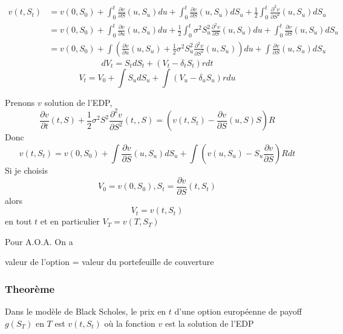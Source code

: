 \documentclass{article}
\theoremstyle{plain}
\theoremstyle{definition}
\begin{document}
\begin{equation}
\begin{split}
v(t, S_t)&=v(0,S_0)+\int_0^t\frac{\partial v}{\partial S}(u,S_u)du+\int_0^t\frac{\partial v}{\partial S}(u, S_u)
 dS_u + \frac{1}{2}\int_0^t\frac{\partial^2 v}{\partial S^2}(u,S_u)dS_u\\
 &=v(0,S_0)+\int_0^t\frac{\partial v}{\partial u}(u,S_u)du+\frac{1}{2}\int_0^t\sigma^2S_u^2\frac{\partial^2 v}{\partial S}(u,S_u)du+\int_0^t\frac{\partial v}{\partial S}(u, S_u)dS_u\\
 &=v(0,S_0)+\int (\frac{\partial v}{\partial u}(u,S_u)+\frac{1}{2}\sigma^2S_u^2\frac{\partial^2 v}{\partial S^2}(u,S_u))du+\int \frac{\partial v}{\partial S}(u, S_u)dS_u
\end{split}
\end{equation}
\begin{equation}
dV_t=S_tdS_t+(V_t-\delta_tS_t)r dt
\end{equation}
\begin{equation}
V_t=V_0+\int S_u dS_u+\int (V_u-\delta_uS_u)rdu
\end{equation}

Prenons $v$ solution de l'EDP,
\begin{equation}
\frac{\partial v}{\partial t}(t,S)+\frac{1}{2}\sigma^2S^2\frac{\partial^2 v}{\partial S^2}(t,,S)=(v(t,S_t)-\frac{\partial v}{\partial S}(u,S)S)R
\end{equation}
Donc 
\begin{equation}
v(t,S_t)=v(0,S_0)+\int\frac{\partial v}{\partial S}(u,S_u) dS_u+\int (v(u,S_u)-S_u\frac{\partial v}{\partial S})Rdt
\end{equation}
Si je choisis
\begin{equation}
V_0=v(0,S_0), S_t=\frac{\partial v}{\partial S}(t,S_t)
\end{equation}
alors
\begin{equation}
V_t=v(t,S_t)
\end{equation}
en tout $t$ et en particulier $V_T=v(T,S_T)$

Pour A.O.A. On a

valeur de l'option = valeur du portefeuille de couverture

\subsubsection{Theor\`eme}
Dans le mod\`ele de Black Scholes, le prix en $t$ d'une option europ\'eenne de payoff $g(S_T)$ en $T$ est $v(t,S_t)$ o\`u la fonction $v$ est la solution de l'EDP
\end{document}
